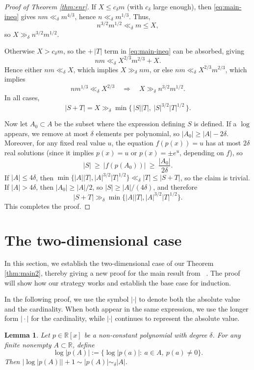 \documentclass[12pt,reqno]{amsart}
\numberwithin{equation}{section}
\newtheorem{lemma}[theorem]{Lemma}
\begin{document}
\begin{proof}[Proof of Theorem \ref{thm:enr}]
If \(X \le c_\delta m\) (with \(c_\delta\) large enough), then \eqref{eq:main-ineq} gives
\(nm \ll_\delta m^{4/3}\), hence \(n \ll_\delta m^{1/3}\). Thus,
\[
n^{3/2}m^{1/2}\ll_\delta m \le X,
\]
so \(X\gg_\delta n^{3/2}m^{1/2}\).

Otherwise \(X>c_\delta m\), so the \(+\,|T|\) term in \eqref{eq:main-ineq} can be absorbed, giving
\[
nm \ll_{\delta} X^{2/3}m^{2/3} + X.
\]
Hence either \(nm \ll_\delta X\), which implies \(X\gg_\delta nm\), or else \(nm \ll_\delta X^{2/3}m^{2/3}\), which implies
\[
n m^{1/3}\ll_\delta X^{2/3}
\quad\Rightarrow\quad
X\gg_\delta n^{3/2}m^{1/2}.
\]
In all cases,
\[
|S+T| = X \gg_\delta \min\{\,|S||T|,\ |S|^{3/2}|T|^{1/2}\,\}.
\]

Now let \(A_0\subset A\) be the subset where the expression defining \(S\) is defined. If a \(\log\) appears, we remove at most \(\delta\) elements per polynomial, so \(|A_0|\ge |A|-2\delta\).
Moreover, for any fixed real value \(u\), the equation \(f(p(x))=u\) has at most \(2\delta\) real solutions (since it implies \(p(x)=u\) or \(p(x)=\pm e^{u}\), depending on \(f\)), so
\[
|S|\ \ge\ |f(p(A_0))|\ \ge\ \frac{|A_0|}{2\delta}.
\]
If \(|A|\le 4\delta\), then \(\min\{|A||T|,|A|^{3/2}|T|^{1/2}\}\ll_\delta |T|\le |S+T|\), so the claim is trivial.
If \(|A|>4\delta\), then \(|A_0|\ge |A|/2\), so \(|S|\ge |A|/(4\delta)\), and therefore
\[
|S+T|\gg_\delta \min\{|A||T|,|A|^{3/2}|T|^{1/2}\}.
\]
This completes the proof.
\end{proof}



\section{The two-dimensional case}
In this section, we establish the two-dimensional case of our Theorem \ref{thm:main2}, thereby giving a new proof for the main result from ~\cite{jing2022semialgebraic}. The proof will show how our strategy works and establish the base case for induction.

In the following proof, we use the symbol $|\cdot|$ to denote both the absolute value and the cardinality. When both appear in the same expression, we use the longer form $\Big|\cdot\Big|$ for the cardinality, while $|\cdot|$ continues to represent the absolute value.



\begin{lemma}\label{lem:size}
Let $p\in \mathbb{R}[x]$ be a non-constant polynomial with degree $\delta$.
For any finite nonempty $A\subset \mathbb{R}$, define
\[
\log|p(A)|:=\{\log|p(a)|:\ a\in A,\ p(a)\neq 0\}.
\]
Then $\Big|\log|p(A)|\Big|+1\sim \Big|p(A)\Big|\sim_{\delta}\Big|A\Big|$.
\end{lemma}
\end{document}
